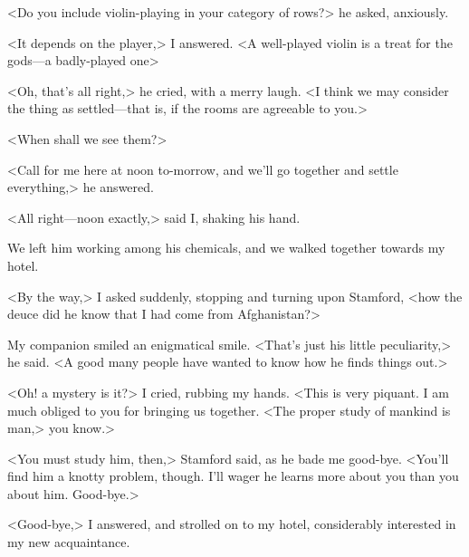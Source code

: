<Do you include violin-playing in your category of rows?> he asked, anxiously.

<It depends on the player,> I answered. <A well-played violin is a treat for the gods—a badly-played one\longdash>

<Oh, that's all right,> he cried, with a merry laugh. <I think we may consider the thing as settled—that is, if the rooms are agreeable to you.>

<When shall we see them?>

<Call for me here at noon to-morrow, and we'll go together and settle everything,> he answered.

<All right—noon exactly,> said I, shaking his hand.

We left him working among his chemicals, and we walked together towards my hotel.

<By the way,> I asked suddenly, stopping and turning upon Stamford, <how the deuce did he know that I had come from Afghanistan?>

My companion smiled an enigmatical smile. <That's just his little peculiarity,> he said. <A good many people have wanted to know how he finds things out.>

<Oh! a mystery is it?> I cried, rubbing my hands. <This is very piquant. I am much obliged to you for bringing us together. <The proper study of mankind is man,> you know.>

<You must study him, then,> Stamford said, as he bade me good-bye. <You'll find him a knotty problem, though. I'll wager he learns more about you than you about him. Good-bye.>

<Good-bye,> I answered, and strolled on to my hotel, considerably interested in my new acquaintance.